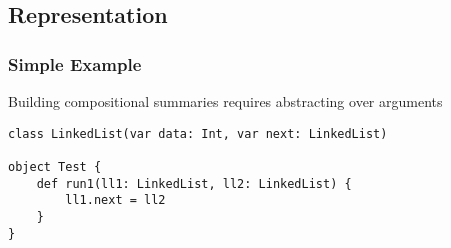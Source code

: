\documentclass[hyperref={pdfpagelabels=false}]{beamer}
\begin{document}
\subsection{Representation}

\begin{frame}[fragile]
\frametitle{Simple Example}

    Building compositional summaries requires abstracting over arguments

\begin{lstlisting}
class LinkedList(var data: Int, var next: LinkedList)

object Test {
    def run1(ll1: LinkedList, ll2: LinkedList) {
        ll1.next = ll2
    }
}
\end{lstlisting}
\end{frame}
\end{document}
